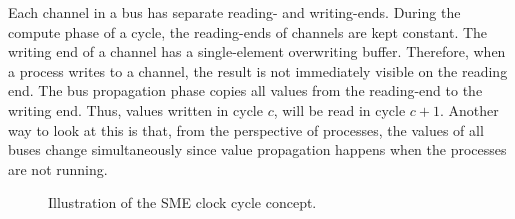 Each channel in a bus has separate reading- and writing-ends. During the compute
phase of a cycle, the reading-ends of channels are kept constant. The writing
end of a channel has a single-element overwriting buffer. Therefore, when a
process writes to a channel, the result is not immediately visible on the
reading end. The bus propagation phase copies all values from the reading-end to
the writing end. Thus, values written in cycle $c$, will be read in cycle
$c+1$. Another way to look at this is that, from the perspective of processes,
the values of all buses change simultaneously since value propagation happens
when the processes are not running.


\begin{figure}
  \centering
{}
\caption{Illustration of the SME clock cycle concept.}
\label{fig:smeclock}
\end{figure}






